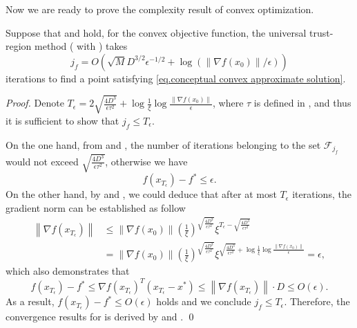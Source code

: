 Now we are ready to prove the complexity result of convex optimization.
\begin{theorem}
    \label{thm.complexity convex}
    Suppose that  and  hold, for the convex objective function, the universal trust-region method ( with ) takes
    $$
        j_f=O\left(\sqrt{M}D^{3/2}\epsilon^{-1/2}+\log\left(\|\nabla f(x_0)\|/\epsilon\right)\right)
    $$
    iterations to find a point satisfying \eqref{eq.conceptual convex approximate solution}.
\end{theorem}
\begin{proof}
    Denote $T_\epsilon = 2\sqrt{\frac{4D^3}{\epsilon\tau^2}}+\log \frac{1}{\xi}\log \frac{\|\nabla f(x_0)\|}{\epsilon}$, where $\tau$ is defined in , and thus it is sufficient to show that $j_f \leq T_\epsilon$.

    On the one hand, from  and , the number of iterations belonging to the set $\mathcal{F}_{j_f}$ would not exceed $\sqrt{\frac{4D^3}{\epsilon\tau^2}}$, otherwise we have
    \begin{equation*}
        f\left(x_{T_\epsilon}\right)-f^*\leq \epsilon.
    \end{equation*}
    On the other hand, by  and , we could deduce that after at most $T_\epsilon$ iterations, the gradient norm can be established as follow
    \begin{equation*}
    \begin{aligned}
        \left\|\nabla f(x_{T_\epsilon})\right\| &\leq \|\nabla f(x_0)\|\left (\frac{1}{\xi}\right )^{\sqrt{\frac{4D^3}{\epsilon\tau^2}}} \xi^{T_\epsilon-\sqrt{\frac{4D^3}{\epsilon\tau^2}}}\\
        &= \|\nabla f(x_0)\|\left (\frac{1}{\xi}\right )^{\sqrt{\frac{4D^3}{\epsilon\tau^2}}} \xi^{\sqrt{\frac{4D^3}{\epsilon\tau^2}}+\log \frac{1}{\xi}\log \frac{\|\nabla f(x_0)\|}{\epsilon}} = \epsilon,
    \end{aligned}
    \end{equation*}
    which also demonstrates that
    \begin{equation*}
        f\left(x_{T_\epsilon}\right)-f^* \leq \nabla f(x_{T_\epsilon})^T(x_{T_\epsilon}-x^*) \leq \left\|\nabla f(x_{T_\epsilon})\right\|\cdot D \le O\left (\epsilon\right).
    \end{equation*}
    As a result, $f(x_{T_\epsilon}) -f^* \leq O(\epsilon)$ holds and we conclude $j_f\leq T_\epsilon$.
    Therefore, the convergence results for  is derived by  and .
\smartqed \qed \end{proof}
